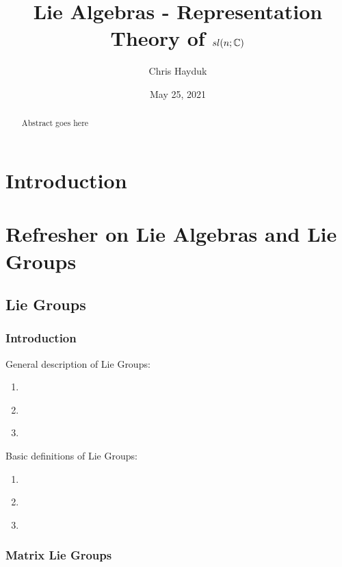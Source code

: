 \documentclass[11pt, a4paper, oneside]{article}
\theoremstyle{plain}
\theoremstyle{definition}
\theoremstyle{example}
\begin{document}
\title{Lie Algebras - Representation Theory of $sl(n; \mathbb{C})$}
\author{Chris Hayduk}
\date{May 25, 2021}
\maketitle

\begin{abstract}
Abstract goes here
\end{abstract}

\newpage
\section{Introduction}

\section{Refresher on Lie Algebras and Lie Groups}

\subsection{Lie Groups}

\subsubsection{Introduction}

General description of Lie Groups: 
\begin{enumerate}
\item \cite{liegroupwiki}

\item \cite[Section 1.1]{stillwell}

\item \cite[Section 1.6]{stillwell}
\end{enumerate}

Basic definitions of Lie Groups:
\begin{enumerate}
\item \cite{liegroupwiki}

\item \cite[Section 1.1]{hall}

\item \cite[Section 1.5]{hall}
\end{enumerate}

\subsubsection{Matrix Lie Groups}
\end{document}
